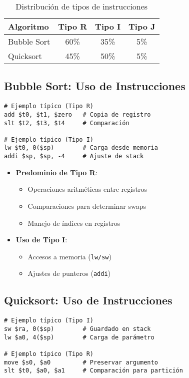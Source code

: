 \documentclass{article}
\begin{document}
\begin{table}[h]
\centering
\caption{Distribución de tipos de instrucciones}
\begin{tabular}{|l|c|c|c|}
\hline
\textbf{Algoritmo} & \textbf{Tipo R} & \textbf{Tipo I} & \textbf{Tipo J} \\
\hline
Bubble Sort & 60\% & 35\% & 5\% \\
\hline
Quicksort & 45\% & 50\% & 5\% \\
\hline
\end{tabular}
\end{table}

\subsection*{Bubble Sort: Uso de Instrucciones}

\begin{verbatim}
# Ejemplo típico (Tipo R)
add $t0, $t1, $zero   # Copia de registro
slt $t2, $t3, $t4     # Comparación

# Ejemplo típico (Tipo I)
lw $t0, 0($sp)        # Carga desde memoria
addi $sp, $sp, -4     # Ajuste de stack
\end{verbatim}

\begin{itemize}
    \item \textbf{Predominio de Tipo R}:
    \begin{itemize}
        \item Operaciones aritméticas entre registros
        \item Comparaciones para determinar swaps
        \item Manejo de índices en registros
    \end{itemize}
    
    \item \textbf{Uso de Tipo I}:
    \begin{itemize}
        \item Accesos a memoria (\texttt{lw/sw})
        \item Ajustes de punteros (\texttt{addi})
    \end{itemize}
\end{itemize}

\subsection*{Quicksort: Uso de Instrucciones}

\begin{verbatim}
# Ejemplo típico (Tipo I)
sw $ra, 0($sp)        # Guardado en stack
lw $a0, 4($sp)        # Carga de parámetro

# Ejemplo típico (Tipo R)
move $s0, $a0         # Preservar argumento
slt $t0, $a0, $a1     # Comparación para partición
\end{verbatim}
\end{document}
